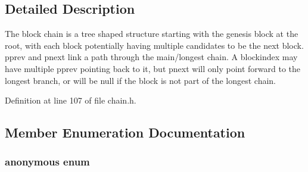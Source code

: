 \subsection{Detailed Description}
The block chain is a tree shaped structure starting with the genesis block at the root, with each block potentially having multiple candidates to be the next block. pprev and pnext link a path through the main/longest chain. A blockindex may have multiple pprev pointing back to it, but pnext will only point forward to the longest branch, or will be null if the block is not part of the longest chain. 

Definition at line 107 of file chain.\+h.



\subsection{Member Enumeration Documentation}
\hypertarget{class_c_block_index_a9f5cdb9616b0204a8906522bdc26415f}{}\subsubsection[{anonymous enum}]{\setlength{\rightskip}{0pt plus 5cm}anonymous enum}\label{class_c_block_index_a9f5cdb9616b0204a8906522bdc26415f}
